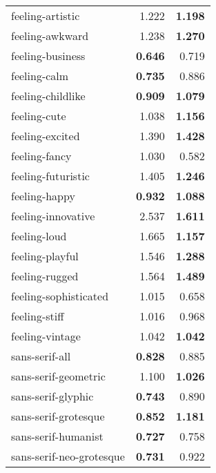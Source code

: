 \begin{longtable}{|l|r|r|}
feeling-artistic          & 1.222                   & \textbf{1.198}      \\
feeling-awkward           & 1.238                   & \textbf{1.270}      \\
feeling-business          & \textbf{0.646}          & 0.719               \\
feeling-calm              & \textbf{0.735}          & 0.886               \\
feeling-childlike         & \textbf{0.909}          & \textbf{1.079}      \\
feeling-cute              & 1.038                   & \textbf{1.156}      \\
feeling-excited           & 1.390                   & \textbf{1.428}      \\
feeling-fancy             & 1.030                   & 0.582               \\
feeling-futuristic        & 1.405                   & \textbf{1.246}      \\
feeling-happy             & \textbf{0.932}          & \textbf{1.088}      \\
feeling-innovative        & 2.537                   & \textbf{1.611}      \\
feeling-loud              & 1.665                   & \textbf{1.157}      \\
feeling-playful           & 1.546                   & \textbf{1.288}      \\
feeling-rugged            & 1.564                   & \textbf{1.489}      \\
feeling-sophisticated     & 1.015                   & 0.658               \\
feeling-stiff             & 1.016                   & 0.968               \\
feeling-vintage           & 1.042                   & \textbf{1.042}      \\
sans-serif-all            & \textbf{0.828}          & 0.885               \\
sans-serif-geometric      & 1.100                   & \textbf{1.026}      \\
sans-serif-glyphic        & \textbf{0.743}          & 0.890               \\
sans-serif-grotesque      & \textbf{0.852}          & \textbf{1.181}      \\
sans-serif-humanist       & \textbf{0.727}          & 0.758               \\
sans-serif-neo-grotesque  & \textbf{0.731}          & 0.922               \\

\end{longtable}
